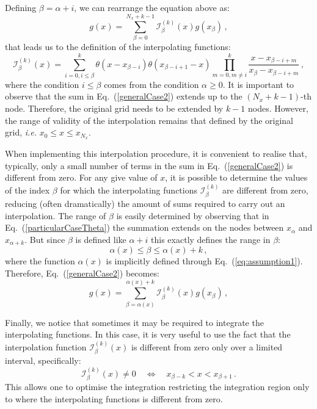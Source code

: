 \documentclass[10pt,a4paper]{article}
\begin{document}
Defining $\beta=\alpha+i$, we can rearrange the equation above as:
\begin{equation}\label{generalCase2}
  g(x) =
  \sum_{\beta=0}^{N_x+k-1}\mathcal{I}_\beta^{(k)}(x) g(x_{\beta})\,,
\end{equation}
that leads us to the definition of the interpolating functions:
\begin{equation}\label{eq:intfunc}
  \mathcal{I}_\beta^{(k)}(x) = \sum_{i=0,i\leq\beta}^k
  \theta(x-x_{\beta-i})\theta(x_{\beta-i+1}-x) \prod^{k}_{m=0,m\ne
    i}\frac{x-x_{\beta-i+m}}{x_{\beta}-x_{\beta-i+m}}\,,
\end{equation}
where the condition $i\leq\beta$ comes from the condition
$\alpha\geq 0$. It is important to observe that the sum in
Eq.~(\ref{generalCase2}) extends up to the $(N_x+k-1)$-th
node. Therefore, the original grid needs to be extended by $k-1$
nodes. However, the range of validity of the interpolation remains
that defined by the original grid, \textit{i.e.}
$x_0 \leq x \leq x_{N_x}$. 

When implementing this interpolation procedure, it is convenient to
realise that, typically, only a small number of terms in the sum in
Eq.~(\ref{generalCase2}) is different from zero. For any give value of
$x$, it is possible to determine the values of the index $\beta$ for
which the interpolating functions $\mathcal{I}_\beta^{(k)}$ are
different from zero, reducing (often dramatically) the amount of sums
required to carry out an interpolation. The range of $\beta$ is easily
determined by observing that in Eq.~(\ref{particularCaseTheta}) the
summation extends on the nodes between $x_\alpha$ and
$x_{\alpha+k}$. But since $\beta$ is defined like $\alpha+i$ this
exactly defines the range in $\beta$:
\begin{equation}
\alpha(x) \leq \beta \leq \alpha(x) + k\,,
\end{equation}
where the function $\alpha(x)$ is implicitly defined through
Eq.~(\ref{eq:assumption1}). Therefore, Eq.~(\ref{generalCase2})
becomes:
\begin{equation}\label{eq:limitedsum}
  g(x) =
  \sum_{\beta=\alpha(x)}^{\alpha(x)+k}\mathcal{I}_\beta^{(k)}(x) g(x_{\beta})\,,
\end{equation}

Finally, we notice that sometimes it may be required to integrate the
interpolating functions. In this case, it is very useful to use the
fact that the interpolation function $\mathcal{I}_\beta^{(k)}(x)$ is
different from zero only over a limited interval, specifically:
\begin{equation}\label{eq:limits}
\mathcal{I}_\beta^{(k)}(x) \neq 0\quad \Leftrightarrow\quad
x_{\beta-k}<x < x_{\beta+1}\,.
\end{equation}
This allows one to optimise the integration restricting the
integration region only to where the interpolating functions is
different from zero.
\end{document}

